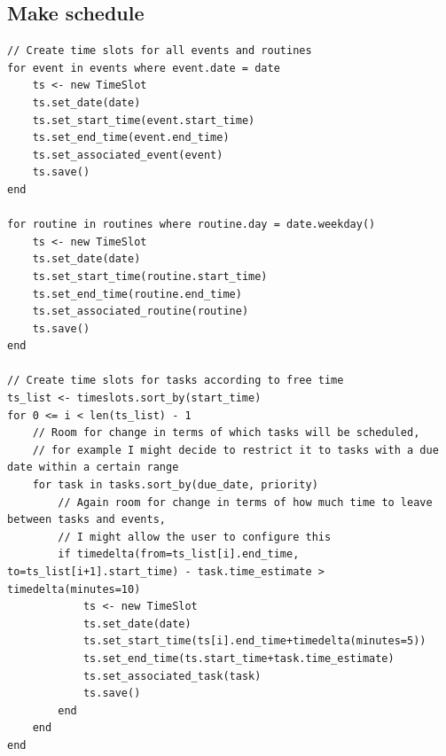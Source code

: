\documentclass{article}
\begin{document}
\subsection{Make schedule}
\begin{lstlisting}[breaklines]
// Create time slots for all events and routines
for event in events where event.date = date
    ts <- new TimeSlot
    ts.set_date(date)
    ts.set_start_time(event.start_time)
    ts.set_end_time(event.end_time)
    ts.set_associated_event(event)
    ts.save()
end

for routine in routines where routine.day = date.weekday()
    ts <- new TimeSlot
    ts.set_date(date)
    ts.set_start_time(routine.start_time)
    ts.set_end_time(routine.end_time)
    ts.set_associated_routine(routine)
    ts.save()
end

// Create time slots for tasks according to free time
ts_list <- timeslots.sort_by(start_time)
for 0 <= i < len(ts_list) - 1
    // Room for change in terms of which tasks will be scheduled,
    // for example I might decide to restrict it to tasks with a due date within a certain range
    for task in tasks.sort_by(due_date, priority)
        // Again room for change in terms of how much time to leave between tasks and events,
        // I might allow the user to configure this
        if timedelta(from=ts_list[i].end_time, to=ts_list[i+1].start_time) - task.time_estimate > timedelta(minutes=10)
            ts <- new TimeSlot
            ts.set_date(date)
            ts.set_start_time(ts[i].end_time+timedelta(minutes=5))
            ts.set_end_time(ts.start_time+task.time_estimate)
            ts.set_associated_task(task)
            ts.save()
        end
    end
end
\end{lstlisting}
\end{document}
